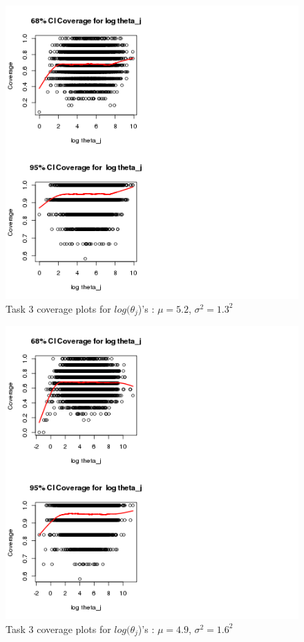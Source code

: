 \documentclass[paper=a4, fontsize=11pt]{scrartcl}
\begin{document}
\begin{figure}[h!]
  \caption{Task 3 coverage plots for $log(\theta_{j}$)'s : $\mu = 5.2$, $\sigma^2 = 1.3^2$}
  \centering
	\includegraphics[scale=1, trim = 0 0 200 0]{keskici_wxiao_ps2_task3_plot3.png}
\end{figure}

\begin{figure}[h!]
  \caption{Task 3 coverage plots for $log(\theta_{j}$)'s : $\mu = 4.9$, $\sigma^2 = 1.6^2$}
  \centering
	\includegraphics[scale=1, trim = 0 0 200 0]{keskici_wxiao_ps2_task3_plot4.png}
\end{figure}
\end{document}
